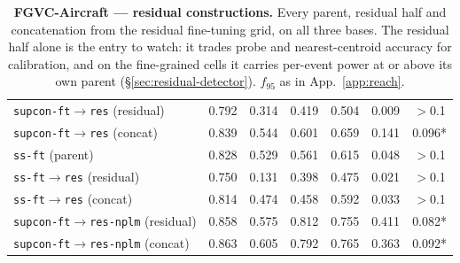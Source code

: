 \documentclass{article}
\begin{document}
\begin{table}[p]
\begin{tabular}{lcccccc}
\texttt{supcon-ft$\to$res} (residual) & 0.792 & 0.314 & 0.419 & 0.504 & 0.009 & $>$0.1 \\
\texttt{supcon-ft$\to$res} (concat) & 0.839 & 0.544 & 0.601 & 0.659 & 0.141 & 0.096* \\
\texttt{ss-ft} (parent) & 0.828 & 0.529 & 0.561 & 0.615 & 0.048 & $>$0.1 \\
\texttt{ss-ft$\to$res} (residual) & 0.750 & 0.131 & 0.398 & 0.475 & 0.021 & $>$0.1 \\
\texttt{ss-ft$\to$res} (concat) & 0.814 & 0.474 & 0.458 & 0.592 & 0.033 & $>$0.1 \\
\texttt{supcon-ft$\to$res-nplm} (residual) & 0.858 & 0.575 & 0.812 & 0.755 & 0.411 & 0.082* \\
\texttt{supcon-ft$\to$res-nplm} (concat) & 0.863 & 0.605 & 0.792 & 0.765 & 0.363 & 0.092* \\
\bottomrule
\end{tabular}
\caption{\textbf{FGVC-Aircraft --- residual constructions.} Every parent, residual half
and concatenation from the residual fine-tuning grid, on all three bases.
The residual half alone is the entry to watch: it trades probe and
nearest-centroid accuracy for calibration, and on the fine-grained cells it
carries per-event power at or above its own parent
(\S\ref{sec:residual-detector}). $f_{95}$ as in App.~\ref{app:reach}.}
\label{tab:res-aircraft}
\end{table}
\end{document}
